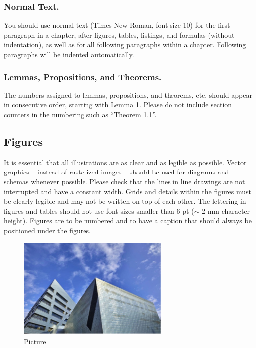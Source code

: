 \subsubsection{Normal Text.}
You should use normal text (Times New Roman, font size 10) for the first paragraph in a chapter, after figures, tables, listings, and formulas (without indentation), as well as for all following paragraphs within a chapter. 
Following paragraphs will be indented automatically.

\subsubsection{Lemmas, Propositions, and Theorems.}
The numbers assigned to lemmas, propositions, and theorems, etc. should appear in consecutive order, starting with Lemma 1. 
Please do not include section counters in the numbering such as “Theorem 1.1”.

\subsection{Figures} 
It is essential that all illustrations are as clear and as legible as possible. 
Vector graphics – instead of rasterized images – should be used for diagrams and schemas whenever possible. 
Please check that the lines in line drawings are not interrupted and have a constant width. 
Grids and details within the figures must be clearly legible and may not be written on top of each other. 
The lettering in figures and tables should not use font sizes smaller than 6 pt ($\sim$ 2 mm character height). 
Figures are to be numbered and to have a caption that should always be positioned under the figures.

\begin{figure}[htp]
    \centering
    \includegraphics[width=0.65\textwidth]{figures/image.JPG}
    \caption{Picture}
    \label{fig:my_label}
\end{figure}


